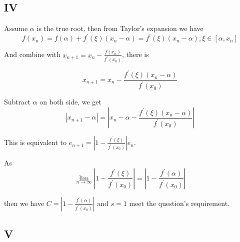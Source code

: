 \documentclass[12]{article}%
\begin{document}
        \subsection{IV}
            Assume $\alpha$ is the true root, then from Taylor's expansion we have
            $$
f(x_n)=f(\alpha)+f^{'}(\xi)(x_n-\alpha)=f^{'}(\xi)(x_n-\alpha),\xi\in [\alpha,x_n]
            $$

            And combine with $x_{n+1}=x_n-\frac{f(x_n)}{f^{'}(x_0)}$, there is 

            $$
x_{n+1}=x_n-\frac{f^{'}(\xi)(x_n-\alpha)}{f^{'}(x_0)}
            $$

            Subtract $\alpha$ on both side, we get
            $$
            |x_{n+1}-\alpha|=|x_n-\alpha-\frac{f^{'}(\xi)(x_n-\alpha)}{f^{'}(x_0)}|
            $$

            This is equivalent to $e_{n+1}=|1-\frac{f^{'}(\xi)}{f^{'}(x_0)}|e_n$.

            As $$\lim_{n\to \infty} |1-\frac{f^{'}(\xi)}{f^{'}(x_0)}|=|1-\frac{f^{'}(\alpha)}{f^{'}(x_0)}|$$

            then we have $C=|1-\frac{f^{'}(\alpha)}{f^{'}(x_0)}|$ and $s=1$ meet the question's requirement.

        \subsection{V}
            
\end{document}
